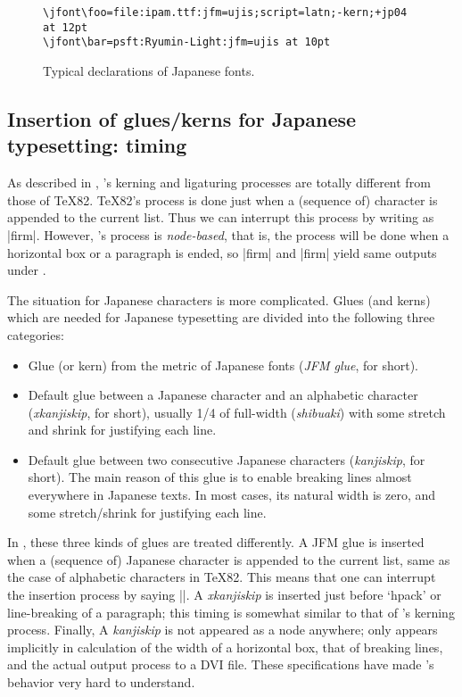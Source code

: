 \documentclass{ajt}
\begin{document}
\begin{figure}
\begin{verbatim}
\jfont\foo=file:ipam.ttf:jfm=ujis;script=latn;-kern;+jp04 at 12pt
\jfont\bar=psft:Ryumin-Light:jfm=ujis at 10pt
\end{verbatim}
\caption{Typical declarations of Japanese fonts.}
\label{fig-jfdef}
\end{figure}

\subsection{Insertion of glues/kerns for Japanese typesetting: timing}
\label{ssec-jglue}

As described in \cite{luatexref}, \LuaTeX's kerning and ligaturing
processes are totally different from those of \TeX82.  \TeX82's process is
done just when a (sequence of) character is appended to the current
list. Thus we can interrupt this process by writing as
|f{}irm|. However, \LuaTeX's process is \emph{node-based}, that is, the
process will be done when a horizontal box or a paragraph is ended, so
|f{}irm| and |firm| yield  same outputs under \LuaTeX.

The situation for Japanese characters is more complicated.
Glues (and kerns) which are needed for Japanese
typesetting are divided into the following three categories:
\begin{itemize}
\item Glue (or kern) from the metric of Japanese fonts (\emph{JFM glue},
      for short). 

\item Default glue between a Japanese character and an alphabetic
      character (\emph{xkanjiskip}, for short), usually 1/4 of
      full-width (\emph{shibuaki}) with some stretch and shrink for
      justifying each line.
\item Default glue between two consecutive Japanese characters
      (\emph{kanjiskip}, for short). The main reason of this glue is to
      enable breaking lines almost everywhere in Japanese texts. In most
      cases, its natural width is zero, and some stretch/shrink for
      justifying each line.
\end{itemize}
In \pTeX, these three kinds of glues are treated differently. A JFM glue
is inserted when a (sequence of) Japanese character is appended to the
current list, same as the case of alphabetic characters in \TeX82. This
means that one can interrupt the insertion process by saying |{}|.  A
\emph{xkanjiskip} is inserted just before `hpack' or line-breaking of a
paragraph; this timing is somewhat similar to that of \LuaTeX's kerning
process. Finally, A \emph{kanjiskip} is not appeared as a node anywhere;
only appears implicitly in calculation of the width of a horizontal box,
that of breaking lines, and the actual output process to a DVI
file. These specifications have made \pTeX's behavior very hard to
understand.
\end{document}
